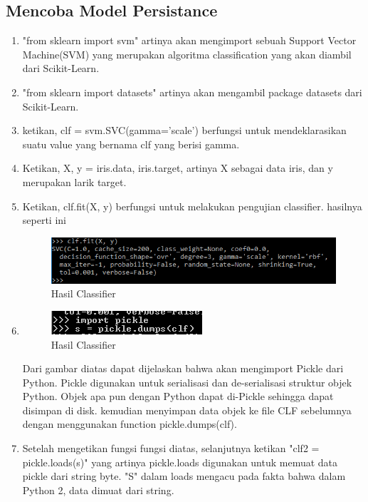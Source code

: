 \subsection{Mencoba Model Persistance}
\begin{enumerate}
\item
 "from sklearn import svm" artinya akan mengimport sebuah Support Vector Machine(SVM) yang merupakan algoritma classification yang akan diambil dari Scikit-Learn.
\item
 "from sklearn import datasets"  artinya akan mengambil package datasets dari Scikit-Learn.
\item
ketikan, clf = svm.SVC(gamma='scale') berfungsi untuk mendeklarasikan suatu value yang bernama clf yang berisi gamma.
\item
Ketikan, X, y = iris.data, iris.target, artinya X sebagai data iris, dan y merupakan larik target.
\item
Ketikan, clf.fit(X, y) berfungsi untuk melakukan pengujian classifier. hasilnya seperti ini
\begin{figure}
	\begin{center}
   	 \includegraphics[scale=1]{figures/andri7.png}
   	 \caption{Hasil  Classifier}	
	\end{center}
\end{figure}
\item
\begin{figure}
	\begin{center}
   	 \includegraphics[scale=1]{figures/andri8.png}
   	 \caption{Hasil  Classifier}	
	\end{center}
\end{figure}
Dari gambar diatas dapat dijelaskan bahwa akan mengimport Pickle dari Python. Pickle digunakan untuk serialisasi dan de-serialisasi struktur objek Python. Objek apa pun dengan Python dapat di-Pickle sehingga dapat disimpan di disk. kemudian menyimpan data objek ke file CLF sebelumnya dengan menggunakan function pickle.dumps(clf).
\item
Setelah mengetikan fungsi fungsi diatas, selanjutnya ketikan "clf2 = pickle.loads(s)" yang artinya pickle.loads digunakan untuk memuat data pickle dari string byte. "S" dalam loads mengacu pada fakta bahwa dalam Python 2, data dimuat dari string.

\end{enumerate}
